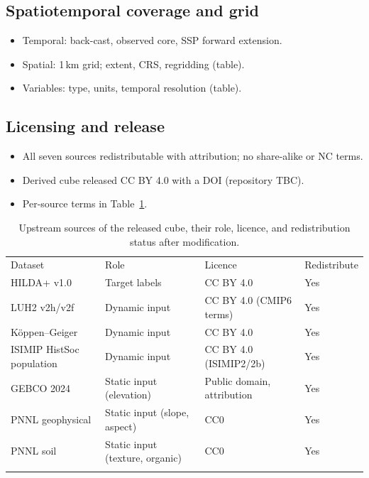 \documentclass[gmd, manuscript]{copernicus}
\begin{document}
\subsection{Spatiotemporal coverage and grid}
\begin{itemize}
\item Temporal: back-cast, observed core, SSP forward extension.
\item Spatial: 1\,km grid; extent, CRS, regridding (table).
\item Variables: type, units, temporal resolution (table).
\end{itemize}

\subsection{Licensing and release}
\begin{itemize}
\item All seven sources redistributable with attribution; no share-alike or NC terms.
\item Derived cube released CC BY 4.0 with a DOI (repository TBC).
\item Per-source terms in Table~\ref{tab:licences}.
\end{itemize}

\begin{table}[t]
\caption{Upstream sources of the released cube, their role, licence, and
redistribution status after modification.}
\label{tab:licences}
\begin{tabular}{llll}
\tophline
Dataset & Role & Licence & Redistribute \\
\middlehline
HILDA+ v1.0 \citep{winkler2020hilda+}        & Target labels             & CC BY 4.0                  & Yes \\
LUH2 v2h/v2f \citep{hurtt2020harmonization}  & Dynamic input             & CC BY 4.0 (CMIP6 terms)    & Yes \\
K{\"o}ppen--Geiger \citep{beck2018present}   & Dynamic input             & CC BY 4.0                  & Yes \\
ISIMIP HistSoc population \citep{frieler2017assessing} & Dynamic input   & CC BY 4.0 (ISIMIP2/2b)     & Yes \\
GEBCO 2024 \citep{GEBCO2024}                 & Static input (elevation)  & Public domain, attribution & Yes \\
PNNL geophysical \citep{li2024global}        & Static input (slope, aspect) & CC0                     & Yes \\
PNNL soil \citep{li2024global}               & Static input (texture, organic) & CC0                  & Yes \\
\bottomhline
\end{tabular}
\end{table}
\end{document}
